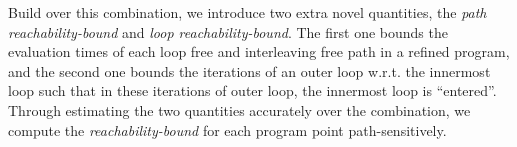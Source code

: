 Build over this combination, we introduce two extra novel quantities,
the \emph{path reachability-bound} and \emph{loop reachability-bound}.
The first one bounds the evaluation times of each loop free and interleaving free path in a refined program, and the second one bounds the iterations of an outer loop w.r.t. the innermost loop such that in these iterations of outer loop, the innermost loop is ``entered''. 
Through estimating the two quantities accurately over the combination, we compute the \emph{reachability-bound} for each program point path-sensitively.
